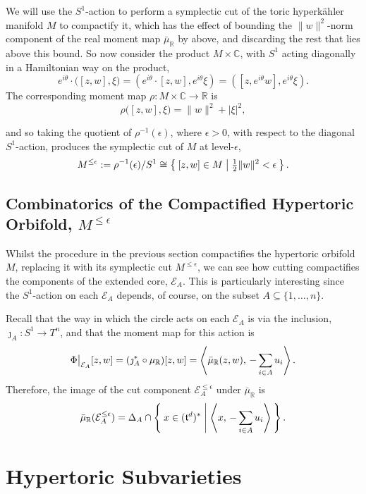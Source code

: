\documentclass{amsart}
\newcommand{\ra}{\rightarrow}
\newcommand{\e}{\epsilon}
\newcommand{\RR}{\mathbb{R}}
\newcommand{\CC}{\mathbb{C}}
\newcommand{\mcE}{\mathcal{E}}
\newcommand{\mft}{\mathfrak{t}}
\newcommand\restr[2]{{%
		\left.\kern-\nulldelimiterspace %
		#1 %
		\vphantom{\big|} %
		\right|_{#2} %
}}
\begin{document}
	We will use the $S^{1}$-action to perform a symplectic cut of the toric hyperk\"ahler manifold $M$ to compactify it, which has the effect of bounding the $\|w\|^{2}$-norm component of the real moment map $\bar{\mu}_{\RR}$ by above, and discarding the rest that lies above this bound. So now consider the product $M \times \CC$, with $S^{1}$ acting diagonally in a Hamiltonian way on the product,
	$$
	e^{i\theta} \cdot \big( [z,w], \xi   \big) = \left( e^{i\theta} \cdot [z,w], e^{i\theta}\xi\right) = \left( [z,e^{i\theta}w], e^{i\theta}\xi\right).
	$$
	The corresponding moment map $\rho : M \times \CC \ra \RR$ is
	\[
	\rho\big( [z,w], \xi  \big) = \|w\|^{2} + |\xi|^{2},
	\]
	
	and so taking the quotient of $\rho^{-1}(\e)$, where $\e > 0$, with respect to the diagonal $S^{1}$-action, produces the symplectic cut of $M$ at level-$\e$, 
	\begin{equation*}
		M^{\leq \e} := \rho^{-1}(\e)/S^{1} \cong \Set{[z,w] \in M | \tfrac{1}{2}\|w\|^{2} < \e}.
	\end{equation*}
	
	\subsection{Combinatorics of the Compactified Hypertoric Orbifold, $M^{\leq \e}$}
	
	Whilst the procedure in the previous section compactifies the hypertoric orbifold $M$, replacing it with its symplectic cut $M^{\leq \e}$, we can see how cutting compactifies the components of the extended core, $\mcE_{A}$. This is particularly interesting since the $S^{1}$-action on each $\mcE_{A}$ depends, of course, on the subset $A \subseteq \{1, \ldots, n\}$.
	
	Recall that the way in which the circle acts on each $\mcE_{A}$ is via the inclusion, $\jmath_{A}: S^{1} \ra T^{n}$, and that the moment map for this action is
	\[
		\restr{\Phi}{\mcE_{A}}[z,w] = (\jmath_{A}^{\ast} \circ \mu_{\RR})[z,w] = \left\langle \bar{\mu}_{\RR}(z,w), \, -\sum_{i \in A} u_{i} \right\rangle.
	\]
	Therefore, the image of the cut component $\mcE_{A}^{\leq \e}$ under $\bar{\mu}_{\RR}$ is
	\[
		\bar{\mu}_{\RR}(\mcE_{A}^{\leq \e}) = \Delta_{A} \cap \Set{x \in (\mft^{d})^{\ast } | \left\langle x,\, -\sum_{i \in A}u_{i} \right\rangle }.
	\]
	
	\section{Hypertoric Subvarieties}
	
	
	  
	
	
\end{document}
